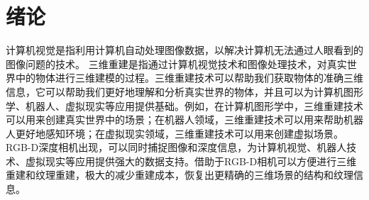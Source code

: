 \chapter{绪论}
计算机视觉是指利用计算机自动处理图像数据，以解决计算机无法通过人眼看到的图像问题的技术。
三维重建是指通过计算机视觉技术和图像处理技术，对真实世界中的物体进行三维建模的过程。三维重建技术可以帮助我们获取物体的准确三维信息，它可以帮助我们更好地理解和分析真实世界的物体，并且可以为计算机图形学、机器人、虚拟现实等应用提供基础。例如，在计算机图形学中，三维重建技术可以用来创建真实世界中的场景；在机器人领域，三维重建技术可以用来帮助机器人更好地感知环境；在虚拟现实领域，三维重建技术可以用来创建虚拟场景。RGB-D深度相机出现，可以同时捕捉图像和深度信息，为计算机视觉、机器人技术、虚拟现实等应用提供强大的数据支持。借助于RGB-D相机可以方便进行三维重建和纹理重建，极大的减少重建成本，恢复出更精确的三维场景的结构和纹理信息。


